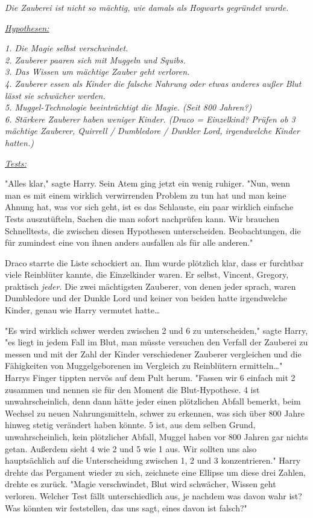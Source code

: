 {\emph{Die Zauberei ist nicht so mächtig, wie damals als Hogwarts gegründet wurde.}

\emph{\uline{Hypothesen:}}

\emph{\emph{1. Die Magie selbst verschwindet.\\ 2. Zauberer paaren sich mit Muggeln und Squibs.\\ 3. Das Wissen um mächtige Zauber geht verloren.\\ 4. Zauberer essen als Kinder die falsche Nahrung oder etwas anderes außer Blut lässt sie schwächer werden.\\ 5. Muggel-Technologie beeinträchtigt die Magie. (Seit 800 Jahren?)\\ 6. Stärkere Zauberer haben weniger Kinder. (Draco = Einzelkind? Prüfen ob 3 mächtige Zauberer, Quirrell / Dumbledore / Dunkler Lord, irgendwelche Kinder hatten.)}}

\emph{\uline{Tests:}}

"Alles klar," sagte Harry. Sein Atem ging jetzt ein wenig ruhiger. "Nun, wenn man es mit einem wirklich verwirrenden Problem zu tun hat und man keine Ahnung hat, was vor sich geht, ist es das Schlauste, ein paar wirklich einfache Tests auszutüfteln, Sachen die man sofort nachprüfen kann. Wir brauchen Schnelltests, die zwischen diesen Hypothesen unterscheiden. Beobachtungen, die für zumindest eine von ihnen anders ausfallen als für alle anderen."

Draco starrte die Liste schockiert an. Ihm wurde plötzlich klar, dass er furchtbar viele Reinblüter kannte, die Einzelkinder waren. Er selbst, Vincent, Gregory, praktisch \emph{jeder.} Die zwei mächtigsten Zauberer, von denen jeder sprach, waren Dumbledore und der Dunkle Lord und keiner von beiden hatte irgendwelche Kinder, genau wie Harry vermutet hatte…

"Es wird wirklich schwer werden zwischen 2 und 6 zu unterscheiden," sagte Harry, "es liegt in jedem Fall im Blut, man müsste versuchen den Verfall der Zauberei zu messen und mit der Zahl der Kinder verschiedener Zauberer vergleichen und die Fähigkeiten von Muggelgeborenen im Vergleich zu Reinblütern ermitteln…" Harrys Finger tippten nervös auf dem Pult herum. "Fassen wir 6 einfach mit 2 zusammen und nennen sie für den Moment die Blut-Hypothese. 4 ist unwahrscheinlich, denn dann hätte jeder einen plötzlichen Abfall bemerkt, beim Wechsel zu neuen Nahrungsmitteln, schwer zu erkennen, was sich über 800 Jahre hinweg stetig verändert haben könnte. 5 ist, aus dem selben Grund, unwahrscheinlich, kein plötzlicher Abfall, Muggel haben vor 800 Jahren gar nichts getan. Außerdem sieht 4 wie 2 und 5 wie 1 aus. Wir sollten uns also hauptsächlich auf die Unterscheidung zwischen 1, 2 und 3 konzentrieren." Harry drehte das Pergament wieder zu sich, zeichnete eine Ellipse um diese drei Zahlen, drehte es zurück. "Magie verschwindet, Blut wird schwächer, Wissen geht verloren. Welcher Test fällt unterschiedlich aus, je nachdem was davon wahr ist? Was könnten wir feststellen, das uns sagt, eines davon ist falsch?"

}
